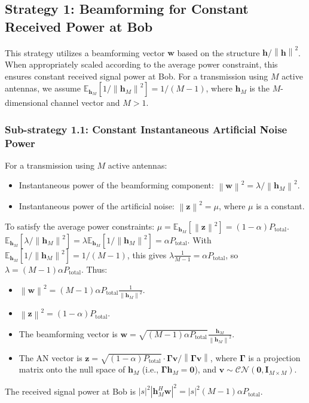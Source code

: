\documentclass[10pt,a4paper]{article} %
\newcommand{\norm}[1]{\left\| #1 \right\|}
\newcommand{\herm}{^H} %
\newcommand{\E}{\mathbb{E}} %
\newcommand{\CN}{\mathcal{CN}} %
\begin{document}
\subsection{Strategy 1: Beamforming for Constant Received Power at Bob}
This strategy utilizes a beamforming vector $\mathbf{w}$ based on the structure $\mathbf{h}/\norm{\mathbf{h}}^2$. When appropriately scaled according to the average power constraint, this ensures constant received signal power at Bob. For a transmission using $M$ active antennas, we assume $\E_{\mathbf{h}_M}[1/\norm{\mathbf{h}_M}^2] = 1/(M-1)$, where $\mathbf{h}_M$ is the $M$-dimensional channel vector and $M>1$.

\subsubsection{Sub-strategy 1.1: Constant Instantaneous Artificial Noise Power}
For a transmission using $M$ active antennas:
\begin{itemize}
    \item Instantaneous power of the beamforming component: $\norm{\mathbf{w}}^2 = \lambda / \norm{\mathbf{h}_M}^2$.
    \item Instantaneous power of the artificial noise: $\norm{\mathbf{z}}^2 = \mu$, where $\mu$ is a constant.
\end{itemize}
To satisfy the average power constraints:
$\mu = \E_{\mathbf{h}_M}[\norm{\mathbf{z}}^2] = (1-\alpha)P_{\text{total}}$.
$\E_{\mathbf{h}_M}[\lambda / \norm{\mathbf{h}_M}^2] = \lambda \E_{\mathbf{h}_M}[1/\norm{\mathbf{h}_M}^2] = \alpha P_{\text{total}}$. With $\E_{\mathbf{h}_M}[1/\norm{\mathbf{h}_M}^2] = 1/(M-1)$, this gives $\lambda \frac{1}{M-1} = \alpha P_{\text{total}}$, so $\lambda = (M-1)\alpha P_{\text{total}}$.
Thus:
\begin{itemize}
    \item $\norm{\mathbf{w}}^2 = (M-1)\alpha P_{\text{total}} \frac{1}{\norm{\mathbf{h}_M}^2}$.
    \item $\norm{\mathbf{z}}^2 = (1-\alpha)P_{\text{total}}$.
    \item The beamforming vector is $\mathbf{w} = \sqrt{(M-1)\alpha P_{\text{total}}} \frac{\mathbf{h}_M}{\norm{\mathbf{h}_M}^2}$.
    \item The AN vector is $\mathbf{z} = \sqrt{(1-\alpha)P_{\text{total}}} \cdot \mathbf{\Gamma} \mathbf{v} / \norm{\mathbf{\Gamma} \mathbf{v}}$, where $\mathbf{\Gamma}$ is a projection matrix onto the null space of $\mathbf{h}_M$ (i.e., $\mathbf{\Gamma}\mathbf{h}_M = \mathbf{0}$), and $\mathbf{v} \sim \CN(\mathbf{0}, \mathbf{I}_{M \times M})$.
\end{itemize}
The received signal power at Bob is $|s|^2|\mathbf{h}_M\herm \mathbf{w}|^2 = |s|^2 (M-1)\alpha P_{\text{total}}$.
\end{document}
